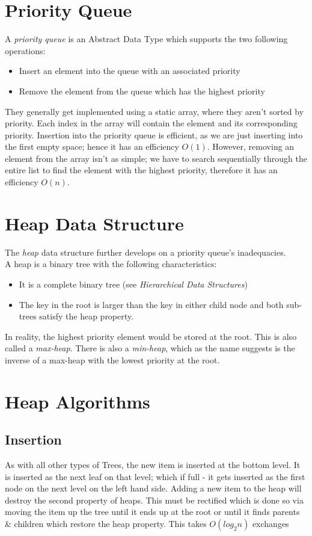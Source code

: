 
\section{Priority Queue}
A \textit{priority queue} is an Abstract Data Type which supports the two following operations:
\begin{itemize}
    \item Insert an element into the queue with an associated priority
    \item Remove the element from the queue which has the highest priority
\end{itemize}
They generally get implemented using a static array, where they aren't sorted by priority. Each index in the array will contain the element and its corresponding priority. Insertion into the priority queue is efficient, as we are just inserting into the first empty space; hence it has an efficiency $O(1)$. However, removing an element from the array isn't as simple; we have to search sequentially through the entire list to find the element with the highest priority, therefore it has an efficiency $O(n)$. 

\section{Heap Data Structure}
The \textit{heap} data structure further develops on a priority queue's inadequacies.\\

A heap is a binary tree with the following characteristics:
\begin{itemize}
    \item It is a complete binary tree (see \textit{Hierarchical Data Structures})
    \item The key in the root is larger than the key in either child node and both sub-trees satisfy the heap property.
\end{itemize}
In reality, the highest priority element would be stored at the root. This is also called a \textit{max-heap}. There is also a \textit{min-heap}, which as the name suggests is the inverse of a max-heap with the lowest priority at the root. 
\section{Heap Algorithms}
\subsection{Insertion}
As with all other types of Trees, the new item is inserted at the bottom level. It is inserted as the next leaf on that level; which if full - it gets inserted as the first node on the next level on the left hand side. Adding a new item to the heap will destroy the second property of heaps. This must be rectified which is done so via moving the item up the tree until it ends up at the root or until it finds parents \& children which restore the heap property. This takes $O(log_2 n)$ exchanges 

